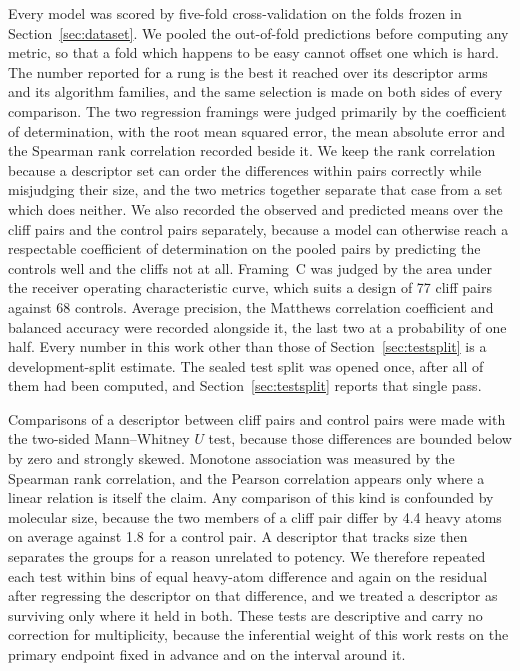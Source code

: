 Every model was scored by five-fold cross-validation on the folds frozen in
Section~\ref{sec:dataset}. We pooled the out-of-fold predictions before computing any
metric, so that a fold which happens to be easy cannot offset one which is hard. The
number reported for a rung is the best it reached over its descriptor arms and its
algorithm families, and the same selection is made on both sides of every comparison.
The two regression framings were judged primarily by the coefficient of determination,
with the root mean squared error, the mean absolute error and the Spearman rank
correlation recorded beside it. We keep the rank correlation because a descriptor set
can order the differences within pairs correctly while misjudging their size, and the
two metrics together separate that case from a set which does neither. We also recorded
the observed and predicted means over the cliff pairs and the control pairs separately,
because a model can otherwise reach a respectable coefficient of determination on the
pooled pairs by predicting the controls well and the cliffs not at all. Framing~C was
judged by the area under the receiver operating characteristic curve, which suits a
design of 77 cliff pairs against 68 controls. Average precision, the Matthews
correlation coefficient and balanced accuracy were recorded alongside it, the last two
at a probability of one half. Every number in this work other than those of
Section~\ref{sec:testsplit} is a development-split estimate. The sealed test split was
opened once, after all of them had been computed, and Section~\ref{sec:testsplit}
reports that single pass.

Comparisons of a descriptor between cliff pairs and control pairs were made with the
two-sided Mann--Whitney $U$ test, because those differences are bounded below by zero
and strongly skewed. Monotone association was measured by the Spearman rank
correlation, and the Pearson correlation appears only where a linear relation is itself
the claim. Any comparison of this kind is confounded by molecular size, because the two
members of a cliff pair differ by 4.4 heavy atoms on average against 1.8 for a control
pair. A descriptor that tracks size then separates the groups for a reason unrelated to
potency. We therefore repeated each test within bins of equal heavy-atom difference and
again on the residual after regressing the descriptor on that difference, and we
treated a descriptor as surviving only where it held in both. These tests are
descriptive and carry no correction for multiplicity, because the inferential weight of
this work rests on the primary endpoint fixed in advance and on the interval around it.

